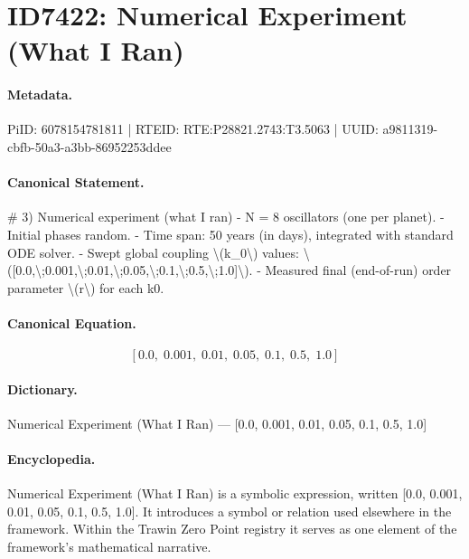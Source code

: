 \section*{ID7422: Numerical Experiment (What I Ran)}
\paragraph{Metadata.}
PiID: 6078154781811 | RTEID: RTE:P28821.2743:T3.5063 | UUID: a9811319-cbfb-50a3-a3bb-86952253ddee

\paragraph{Canonical Statement.}
\# 3) Numerical experiment (what I ran) - N = 8 oscillators (one per planet). - Initial phases random. - Time span: 50 years (in days), integrated with standard ODE solver. - Swept global coupling \textbackslash{}(k\_0\textbackslash{}) values: \textbackslash{}([0.0,\textbackslash{};0.001,\textbackslash{};0.01,\textbackslash{};0.05,\textbackslash{};0.1,\textbackslash{};0.5,\textbackslash{};1.0]\textbackslash{}). - Measured final (end-of-run) order parameter \textbackslash{}(r\textbackslash{}) for each k0.

\paragraph{Canonical Equation.}
\[
[0.0,\;0.001,\;0.01,\;0.05,\;0.1,\;0.5,\;1.0]
\]

\paragraph{Dictionary.}
Numerical Experiment (What I Ran) — [0.0, 0.001, 0.01, 0.05, 0.1, 0.5, 1.0]

\paragraph{Encyclopedia.}
Numerical Experiment (What I Ran) is a symbolic expression, written [0.0, 0.001, 0.01, 0.05, 0.1, 0.5, 1.0]. It introduces a symbol or relation used elsewhere in the framework. Within the Trawin Zero Point registry it serves as one element of the framework's mathematical narrative.
